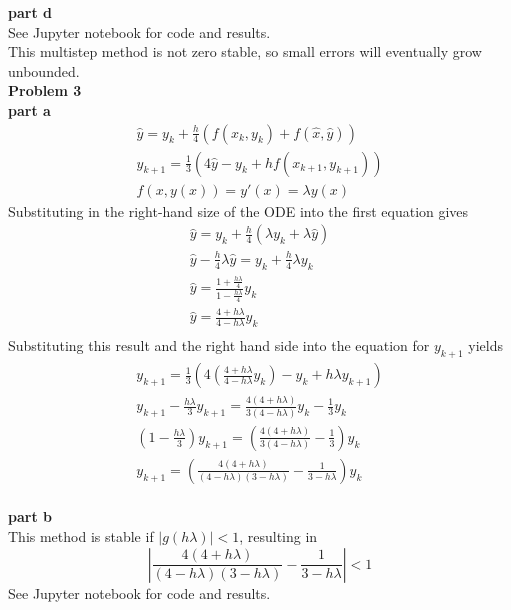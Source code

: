 \documentclass{article} %
\begin{document}
\textbf{part d} \\
See Jupyter notebook for code and results. \\
This multistep method is not zero stable, so small errors will eventually grow unbounded.
\\


\textbf{Problem 3} \\

\textbf{part a} \\
\begin{align*}
\hat{y} = y_k + \frac{h}{4}(f(x_k, y_k) + f(\hat{x}, \hat{y})) \\
y_{k+1} = \frac{1}{3}(4 \hat{y} - y_k + hf(x_{k+1}, y_{k+1})) \\
f(x, y(x)) = y'(x) = \lambda y(x)
\end{align*}
Substituting in the right-hand size of the ODE into the first equation gives
\begin{align*}
\hat{y} = y_k + \frac{h}{4}(\lambda y_k + \lambda\hat{y}) \\
\hat{y} - \frac{h}{4} \lambda\hat{y} = y_k + \frac{h}{4}\lambda y_k \\
\hat{y} = \frac{1 + \frac{h\lambda}{4}}{1 - \frac{h\lambda}{4}} y_k \\
\hat{y} = \frac{4 + h\lambda}{4 - h\lambda} y_k \\
\end{align*}
Substituting this result and the right hand side into the equation for $y_{k+1}$ yields
\begin{align*}
y_{k+1} = \frac{1}{3}(4 (\frac{4 + h\lambda}{4 - h\lambda} y_k) - y_k + h\lambda y_{k+1}) \\
y_{k+1} - \frac{h\lambda}{3} y_{k+1} = \frac{4(4 + h\lambda)}{3(4 - h\lambda)} y_k - \frac{1}{3} y_k \\
(1-\frac{h\lambda}{3})y_{k+1} = (\frac{4(4 + h\lambda)}{3(4 - h\lambda)} - \frac{1}{3})y_k \\
y_{k+1} = (\frac{4(4 + h\lambda)}{(4 - h\lambda)(3 - h\lambda)} - \frac{1}{3 - h\lambda})y_k
\end{align*}
\\

\textbf{part b} \\
This method is stable if $|g(h\lambda)| < 1$, resulting in
\begin{equation}
\left|\frac{4(4 + h\lambda)}{(4 - h\lambda)(3 - h\lambda)} - \frac{1}{3 - h\lambda}\right| < 1
\end{equation}
See Jupyter notebook for code and results.  
\\
\end{document}
